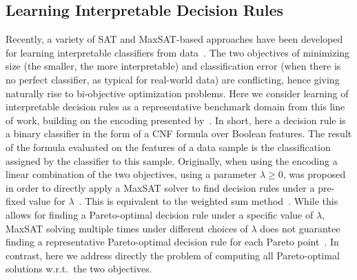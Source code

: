 \subsection{Learning Interpretable Decision Rules\label{sec:lidr}}

Recently, a variety of SAT and MaxSAT-based approaches have been developed for learning interpretable classifiers from data~\autocites{DBLP:conf/ijcai/Ignatiev0NS21,DBLP:conf/cp/MaliotovM18,DBLP:conf/ijcai/NarodytskaIPM18,DBLP:conf/ijcai/Hu0HH20,DBLP:journals/corr/abs-2010-09919,DBLP:conf/cp/YuISB20,DBLP:conf/cade/IgnatievPNM18}.
The two objectives of minimizing size (the smaller, the more interpretable) and classification error (when there is no perfect classifier, as typical for real-world data) are conflicting, hence giving naturally rise to bi-objective optimization problems.
Here we consider learning of interpretable decision rules as a representative benchmark domain from this line of work, building on the encoding presented by~\textcite{DBLP:conf/cp/MaliotovM18}.
In short, here a decision rule is a binary classifier in the form of a CNF formula over Boolean features.
The result of the formula evaluated on the features of a data sample is the classification assigned by the classifier to this sample.
Originally, when using the encoding a linear combination of the two objectives, using a parameter $\lambda\geq 0$, was proposed in order to directly apply a MaxSAT solver to find decision rules under a pre-fixed value for $\lambda$~\autocite{DBLP:conf/cp/MaliotovM18}.
This is equivalent to the weighted sum method~\autocite{Ehrgott2005-3}.
While this allows for finding a Pareto-optimal decision rule under a specific value of $\lambda$, MaxSAT solving multiple times under different choices of $\lambda$ does not guarantee finding a representative Pareto-optimal decision rule for each Pareto point~\autocites{Ehrgott2005-3,survey}.
In contrast, here we address directly the problem of computing all Pareto-optimal solutions w.r.t.\ the two objectives.
\bigskip

